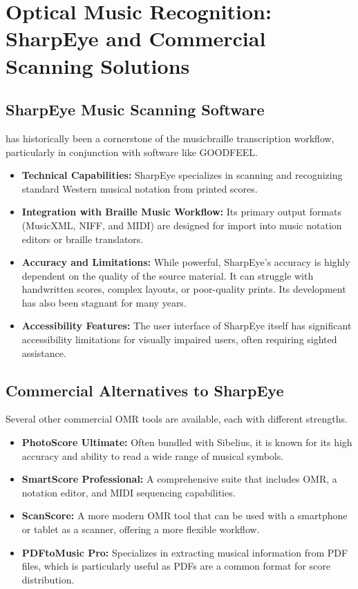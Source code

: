 \section{Optical Music Recognition: SharpEye and Commercial Scanning Solutions}\label{ch10:sec:omr-solutions}

\subsection{SharpEye Music Scanning Software}\label{ch10:ssec:sharpeye}
 has historically been a cornerstone of the \gls{musicbraille} transcription workflow, particularly in conjunction with software like GOODFEEL.
\begin{itemize}
	\item \textbf{Technical Capabilities:} SharpEye specializes in scanning and recognizing standard Western musical notation from printed scores.
	\item \textbf{Integration with Braille Music Workflow:} Its primary output formats (\gls{MusicXML}, NIFF, and MIDI) are designed for import into music notation editors or braille translators.
	\item \textbf{Accuracy and Limitations:} While powerful, SharpEye's accuracy is highly dependent on the quality of the source material. It can struggle with handwritten scores, complex layouts, or poor-quality prints. Its development has also been stagnant for many years.
	\item \textbf{Accessibility Features:} The user interface of SharpEye itself has significant accessibility limitations for visually impaired users, often requiring sighted assistance.
\end{itemize}

\subsection{Commercial Alternatives to SharpEye}\label{ch10:ssec:commercial-alternatives}
Several other commercial \gls{OMR} tools are available, each with different strengths.
\begin{itemize}
	\item \textbf{PhotoScore Ultimate:} Often bundled with Sibelius, it is known for its high accuracy and ability to read a wide range of musical symbols.
	\item \textbf{SmartScore Professional:} A comprehensive suite that includes \gls{OMR}, a notation editor, and MIDI sequencing capabilities.
	\item \textbf{ScanScore:} A more modern \gls{OMR} tool that can be used with a smartphone or tablet as a scanner, offering a more flexible workflow.
	\item \textbf{PDFtoMusic Pro:} Specializes in extracting musical information from PDF files, which is particularly useful as PDFs are a common format for score distribution.
\end{itemize}

